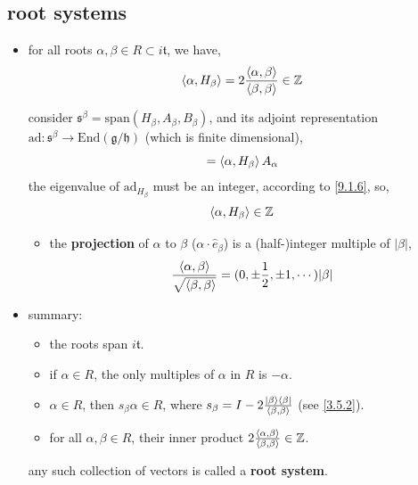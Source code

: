 \subsection{root systems}
\begin{itemize}
	\item for all roots $\alpha, \beta \in R \subset i \mathfrak{t}$, we have,
	\begin{equation}
		\braket{\alpha, H_\beta} = 2 \frac{\braket{\alpha, \beta}}{\braket{\beta, \beta}} \in \mathbb{Z}
	\end{equation}
	
	\begin{tcolorbox}[title=proof:]
		consider $\mathfrak{s}^\beta = \mathrm{span}(H_\beta, A_\beta, B_\beta)$, and its adjoint representation $\mathrm{ad} : \mathfrak{s}^\beta \rightarrow \mathrm{End}(\mathfrak{g} / \mathfrak{h})$ (which is finite dimensional),
		\begin{equation}
			[H_\beta, A_\alpha] = \braket{\alpha, H_\beta} A_\alpha
		\end{equation}
		the eigenvalue of $\mathrm{ad}_{H_\beta}$ must be an integer, according to \eqref{9.1.6}, so,
		\begin{equation}
			\braket{\alpha, H_\beta} \in \mathbb{Z}
		\end{equation}
	\end{tcolorbox}
	
	\begin{itemize}
		\item the \textbf{projection} of $\alpha$ to $\beta$ ($\alpha \cdot \hat{e}_\beta$) is a (half-)integer multiple of $|\beta|$,
		\begin{equation}
			\frac{\braket{\alpha, \beta}}{\sqrt{\braket{\beta, \beta}}} = (0, \pm \frac{1}{2}, \pm 1, \cdots) |\beta|
		\end{equation}
	\end{itemize}
	
	\item summary:
	\begin{itemize}
		\item the roots span $i \mathfrak{t}$.
		
		\item if $\alpha \in R$, the only multiples of $\alpha$ in $R$ is $- \alpha$.
		
		\item $\alpha \in R$, then $s_\beta \alpha \in R$, where $s_\beta = I - 2 \frac{\ket{\beta} \bra{\beta}}{\braket{\beta, \beta}}$ (see \eqref{3.5.2}).
		
		\item for all $\alpha, \beta \in R$, their inner product $2 \frac{\braket{\alpha, \beta}}{\braket{\beta, \beta}} \in \mathbb{Z}$.
	\end{itemize}
	any such collection of vectors is called a \textbf{root system}.
\end{itemize}

